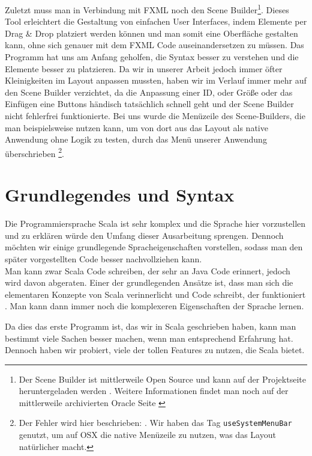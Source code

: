 Zuletzt muss man in Verbindung mit FXML noch den Scene Builder\footnote{Der Scene Builder ist mittlerweile Open Source und kann auf der Projektseite heruntergeladen werden \cite{ProjektseiteSceneBuilder}. Weitere Informationen findet man noch auf der mittlerweile archivierten Oracle Seite \cite{SceneBuilderOracle}}. Dieses Tool erleichtert die Gestaltung von einfachen User Interfaces, indem Elemente per Drag \& Drop platziert werden können und man somit eine Oberfläche gestalten kann, ohne sich genauer mit dem FXML Code auseinandersetzen zu müssen. Das Programm hat uns am Anfang geholfen, die Syntax besser zu verstehen und die Elemente besser zu platzieren. Da wir in unserer Arbeit jedoch immer öfter Kleinigkeiten im Layout anpassen mussten, haben wir im Verlauf immer mehr auf den Scene Builder verzichtet, da die Anpassung einer ID, oder Größe oder das Einfügen eine Buttons händisch tatsächlich schnell geht und der Scene Builder nicht fehlerfrei funktionierte. Bei uns wurde die Menüzeile des Scene-Builders, die man beispielsweise nutzen kann, um von dort aus das Layout als native Anwendung ohne Logik zu testen,  durch das Menü unserer Anwendung überschrieben \footnote{Der Fehler wird hier beschrieben: \cite{BugSceneBuilderMenuBar}. Wir haben das Tag \texttt{useSystemMenuBar} genutzt, um auf OSX die native Menüzeile zu nutzen, was das Layout natürlicher macht.}.

\section{Grundlegendes und Syntax}
Die Programmiersprache Scala ist sehr komplex und die Sprache hier vorzustellen und zu erklären würde den Umfang dieser Ausarbeitung sprengen. Dennoch möchten wir einige grundlegende Spracheigenschaften vorstellen, sodass man den später vorgestellten Code besser nachvollziehen kann.\\
Man kann zwar Scala Code schreiben, der sehr an Java Code erinnert, jedoch wird davon abgeraten. Einer der grundlegenden Ansätze ist, dass man sich die elementaren Konzepte von Scala verinnerlicht und Code schreibt, der funktioniert \cite{GettingStartedWithScala}. Man kann dann immer noch die komplexeren Eigenschaften der Sprache lernen.

Da dies das erste Programm ist, das wir in Scala geschrieben haben, kann man bestimmt viele Sachen besser machen, wenn man entsprechend Erfahrung hat. Dennoch haben wir probiert, viele der tollen Features zu nutzen, die Scala bietet.

